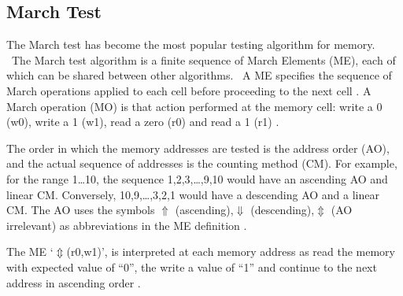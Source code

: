 \subsection{March Test}
The March test has become the most popular testing algorithm for memory.  The March test algorithm is a finite sequence of March Elements (ME), each of which can be shared between other algorithms.  A ME specifies the sequence of March operations applied to each cell before proceeding to the next cell \cite{199799}.  A March operation (MO) is that action performed at the memory cell: write a 0 (w0), write a 1 (w1), read a zero (r0) and read a 1 (r1) \cite{199799}.

The order in which the memory addresses are tested is the address order (AO), and the actual sequence of addresses is the counting method (CM).  For example, for the range 1\ldots10, the sequence 1,2,3,\ldots,9,10 would have an ascending AO and linear CM.  Conversely, 10,9,\ldots,3,2,1 would have a descending AO and a linear CM. The AO uses the symbols $\Uparrow$ (ascending),$\Downarrow$ (descending),$\Updownarrow$ (AO irrelevant) as abbreviations in the ME definition \cite{199799}.

The ME ‘$\Updownarrow$(r0,w1)’, is interpreted at each memory address as read the memory with expected value of “0”, the write a value of “1” and continue to the next address in ascending order \cite{5491773}.    


